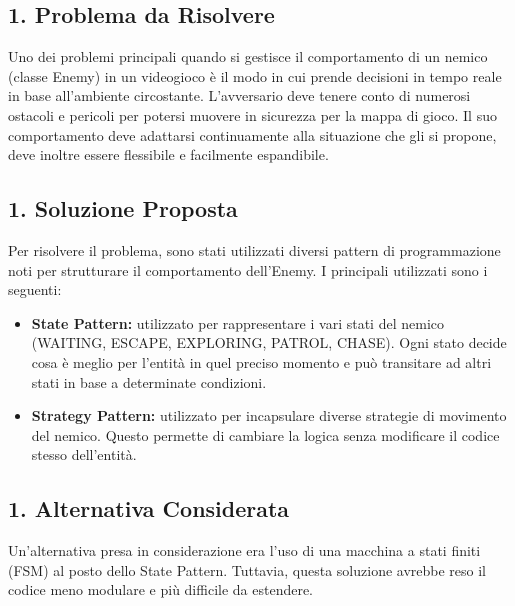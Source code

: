 \documentclass[a4paper,12pt]{report}
\begin{document}
\subsection*{1. Problema da Risolvere}
\par
Uno dei problemi principali quando si gestisce il comportamento di un nemico (classe Enemy) in un videogioco è il modo in cui prende decisioni in tempo reale in base all'ambiente circostante. L’avversario deve tenere conto di numerosi ostacoli e pericoli per potersi muovere in sicurezza per la mappa di gioco. Il suo comportamento deve adattarsi continuamente alla situazione che gli si propone, deve inoltre essere flessibile e facilmente espandibile. 

\subsection*{1. Soluzione Proposta}
Per risolvere il problema, sono stati utilizzati diversi pattern di programmazione noti per strutturare il comportamento dell'Enemy. I principali utilizzati sono i seguenti:
\begin{itemize}
 \item \textbf{State Pattern:} utilizzato per rappresentare i vari stati del nemico (WAITING, ESCAPE, EXPLORING, PATROL, CHASE). Ogni stato decide cosa è meglio per l’entità in quel preciso momento e può transitare ad altri stati in base a determinate condizioni.
 \item \textbf{Strategy Pattern:} utilizzato per incapsulare diverse strategie di movimento del nemico. Questo permette di cambiare la logica senza modificare il codice stesso dell’entità.
\end{itemize}

\subsection*{1. Alternativa Considerata}
\par
Un'alternativa presa in considerazione era l'uso di una macchina a stati finiti (FSM) al posto dello State Pattern. Tuttavia, questa soluzione avrebbe reso il codice meno modulare e più difficile da estendere.
\end{document}
